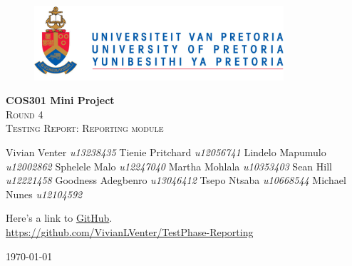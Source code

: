 \begin{titlepage}
	\begin{center}
		
		\begin{figure}[t]
			\centering
			\includegraphics[width=350px]{images/UP_Logo.png}
		\end{figure}
		
		\textbf{\huge COS301 Mini Project } \\ 

		\textsc{\Large Round 4} \\
		\textsc{\large Testing Report: Reporting module } \\ 
		
		\begin{flushright} \large
			Vivian Venter 		\emph{u13238435} \newline
			Tienie Pritchard 	\emph{u12056741} \newline
			Lindelo Mapumulo	\emph{u12002862} \newline
			Sphelele Malo 		\emph{u12247040} \newline
			Martha Mohlala 		\emph{u10353403} \newline
			Sean Hill			\emph{u12221458} \newline
			Goodness Adegbenro	\emph{u13046412} \newline
			Tsepo Ntsaba 		\emph{u10668544} \newline
			Michael Nunes 		\emph{u12104592} \newline
		\end{flushright}
		
		\vfill
		
	Here's a link to \href{https://github.com/VivianLVenter/TestPhase-Reporting}{GitHub}.\\
	\url{https://github.com/VivianLVenter/TestPhase-Reporting}

	\vfill

	{\large \today}		
		
		
	\end{center}
\end{titlepage}
